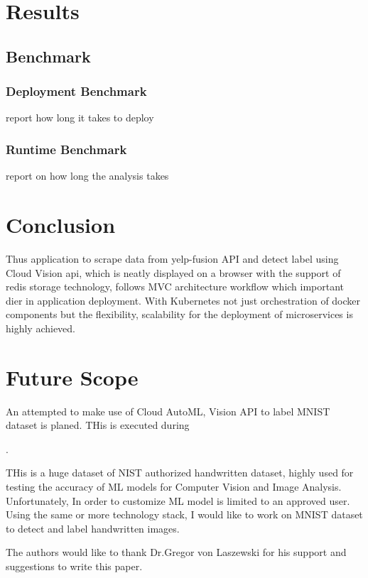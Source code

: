 \section{Results}


\subsection{Benchmark}


\subsubsection{Deployment Benchmark}

report how long it takes to deploy

\subsubsection{Runtime Benchmark}

report on how long the analysis takes



\section{Conclusion}

Thus application to scrape data from yelp-fusion API and detect label
using Cloud Vision api, which is neatly displayed on a browser with
the support of redis storage technology, follows MVC architecture
workflow which important dier in application deployment. With
Kubernetes not just orchestration of docker components but the
flexibility, scalability for the deployment of microservices is highly
achieved.
  
\section{Future Scope}


An attempted to make use of Cloud AutoML, Vision API to label MNIST
dataset is planed. THis is executed during 

.

THis is a huge dataset of NIST authorized handwritten
dataset, highly used for testing the accuracy of ML models for
Computer Vision and Image Analysis. Unfortunately, In order to
customize ML model is limited to an approved user. Using the same or
more technology stack, I would like to work on MNIST dataset to detect
and label handwritten images.

\begin{acks}

  The authors would like to thank Dr.Gregor von Laszewski for his
  support and suggestions to write this paper.
  
\end{acks}

 

